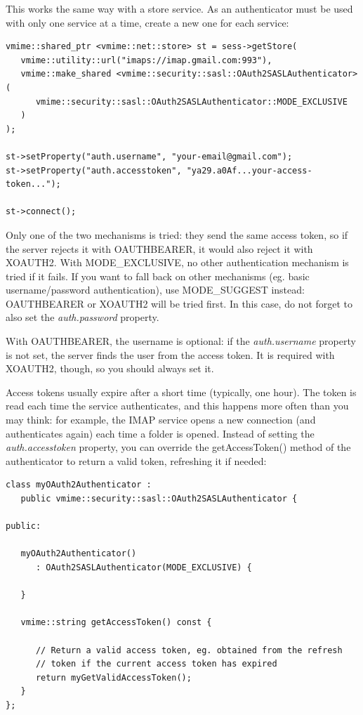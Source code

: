 This works the same way with a store service. As an authenticator must be
used with only one service at a time, create a new one for each service:

\begin{lstlisting}
vmime::shared_ptr <vmime::net::store> st = sess->getStore(
   vmime::utility::url("imaps://imap.gmail.com:993"),
   vmime::make_shared <vmime::security::sasl::OAuth2SASLAuthenticator>(
      vmime::security::sasl::OAuth2SASLAuthenticator::MODE_EXCLUSIVE
   )
);

st->setProperty("auth.username", "your-email@gmail.com");
st->setProperty("auth.accesstoken", "ya29.a0Af...your-access-token...");

st->connect();
\end{lstlisting}

Only one of the two mechanisms is tried: they send the same access token, so
if the server rejects it with OAUTHBEARER, it would also reject it with
XOAUTH2. With {\vcode MODE\_EXCLUSIVE}, no other authentication mechanism is
tried if it fails. If you want to fall back on other mechanisms (eg. basic
username/password authentication), use {\vcode MODE\_SUGGEST} instead:
OAUTHBEARER or XOAUTH2 will be tried first. In this case, do not forget to
also set the \emph{auth.password} property.

With OAUTHBEARER, the username is optional: if the \emph{auth.username}
property is not set, the server finds the user from the access token. It is
required with XOAUTH2, though, so you should always set it.


Access tokens usually expire after a short time (typically, one hour). The
token is read each time the service authenticates, and this happens more
often than you may think: for example, the IMAP service opens a new connection
(and authenticates again) each time a folder is opened. Instead of setting the
\emph{auth.accesstoken} property, you can override the
{\vcode getAccessToken()} method of the authenticator to return a valid token,
refreshing it if needed:

\begin{lstlisting}[caption={Providing a fresh access token on-demand}]
class myOAuth2Authenticator :
   public vmime::security::sasl::OAuth2SASLAuthenticator {

public:

   myOAuth2Authenticator()
      : OAuth2SASLAuthenticator(MODE_EXCLUSIVE) {

   }

   vmime::string getAccessToken() const {

      // Return a valid access token, eg. obtained from the refresh
      // token if the current access token has expired
      return myGetValidAccessToken();
   }
};
\end{lstlisting}



